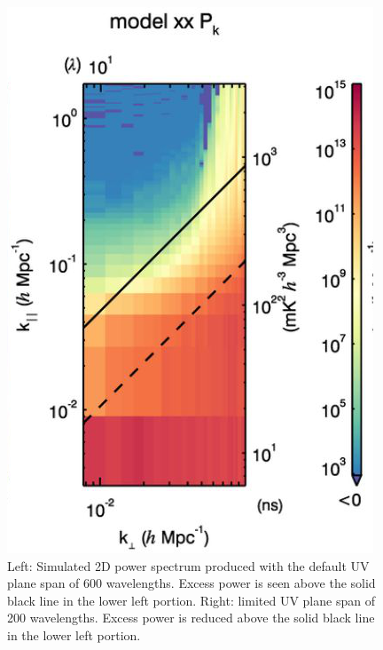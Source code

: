 \documentclass[linenumbers]{aastex631}
\begin{document}
\begin{figure}[htb]
        \includegraphics[scale=.4]{limited.png}
        \caption{Left: Simulated 2D power spectrum produced with the default UV plane span of 600 wavelengths. Excess power is seen above the solid black line in the lower left portion. Right: limited UV plane span of 200 wavelengths. Excess power is reduced above the solid black line in the lower left portion.}
        \label{fig:smudge1}
\end{figure}

        
\end{document}
